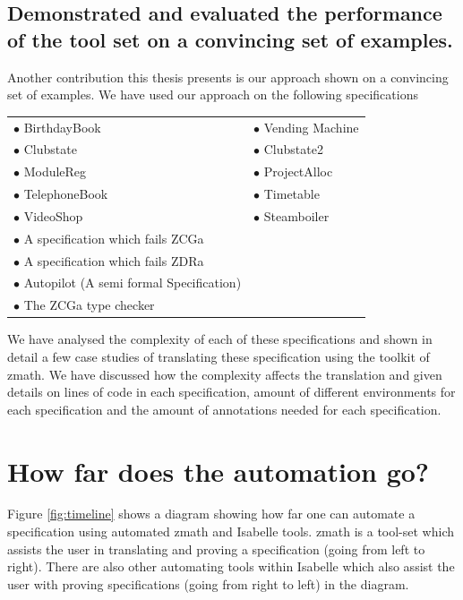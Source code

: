 \subsection{Demonstrated and evaluated the performance of the tool set on a convincing set of examples.}

Another contribution this thesis presents is our approach shown on a convincing
set of examples. We have used our approach on the following specifications

\begin{tabular}{l l}
$\bullet$ BirthdayBook \cite{spiveyreferencemanual} & $\bullet$ Vending Machine
\cite{pp} \\
$\bullet$ Clubstate \cite{essenceofz} & $\bullet$ Clubstate2 \cite{essenceofz}
\\
$\bullet$ ModuleReg \cite{essenceofz} & $\bullet$ ProjectAlloc \cite{essenceofz}
\\
$\bullet$ TelephoneBook & $\bullet$ Timetable \cite{essenceofz} \\
$\bullet$ VideoShop \cite{essenceofz} & $\bullet$ Steamboiler
\cite{steamboilerslides} \\
$\bullet$ A specification which fails ZCGa & \\
$\bullet$ A specification which fails ZDRa & \\
$\bullet$ Autopilot (A semi formal Specification) \cite{Butler96} & \\
$\bullet$ The ZCGa type checker & \\
\end{tabular}

We have analysed the complexity of each of these specifications and shown in
detail a few case studies of translating these specification using the toolkit
of \gls{zmath}. We have discussed how the complexity affects the translation and
given details on lines of code in each specification, amount of different
environments for each specification and the amount of annotations needed for
each specification.

\section{How far does the automation go?}

Figure \ref{fig:timeline} shows a diagram showing how far one can automate a
specification using automated \gls{zmath} and Isabelle tools. \Gls{zmath} is a
tool-set which assists the user in translating and proving a specification (going
from left to right). There are also other automating tools within Isabelle which
also assist the user with proving specifications (going from right to left) in
the diagram.

